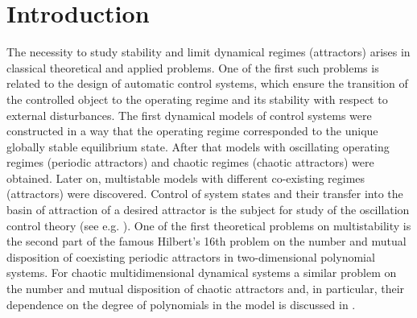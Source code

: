 \documentclass{ifacconf}
\theoremstyle{plain}
\begin{document}
\section{Introduction}

The necessity to study stability and limit dynamical regimes (attractors)
arises in classical theoretical and applied problems.
One of the first such problems is related to the design of automatic control systems,
which ensure the transition of the controlled object to the operating regime
and its stability with respect to external disturbances.
The first dynamical models of control systems were constructed in a way
that the operating regime corresponded to the unique globally stable equilibrium state.
After that models with oscillating operating regimes (periodic attractors)
and chaotic regimes (chaotic attractors) were obtained.
Later on, multistable models with different co-existing regimes (attractors)
were discovered.
Control of system states and their transfer into the basin of attraction of a desired attractor
is the subject for study of the oscillation control theory
(see e.g. \citep{FradkovP-1998,FradkovE-2005}).
One of the first theoretical problems on multistability is
the second part of the famous Hilbert's 16th problem
on the number and mutual disposition of coexisting periodic attractors in two-dimensional
polynomial systems.
For chaotic multidimensional dynamical systems a similar problem on
the number and mutual disposition of chaotic attractors and, in particular, their dependence
on the degree of polynomials in the model
is discussed in \citep{LeonovK-2015-AMC,KuznetsovLMPS-2018}.
\end{document}
